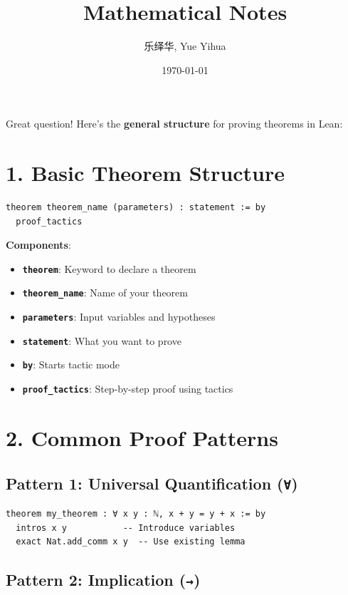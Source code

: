 \documentclass{amsart}
\author{乐绎华, Yue Yihua}
\date{\today}
\title{Mathematical Notes}
\theoremstyle{plain}
\theoremstyle{definition}
\theoremstyle{remark}
\begin{document}
\maketitle
\tableofcontents

Great question! Here's the \textbf{general structure} for proving theorems in Lean:


\section{\textbf{1. Basic Theorem Structure}}

\begin{lstlisting}[language=lean]
theorem theorem_name (parameters) : statement := by
  proof_tactics
\end{lstlisting}
\textbf{Components}:

\begin{itemize}
	\item \textbf{\lstinline{theorem}}: Keyword to declare a theorem
	\item \textbf{\lstinline{theorem_name}}: Name of your theorem
	\item \textbf{\lstinline{parameters}}: Input variables and hypotheses
	\item \textbf{\lstinline{statement}}: What you want to prove
	\item \textbf{\lstinline{by}}: Starts tactic mode
	\item \textbf{\lstinline{proof_tactics}}: Step-by-step proof using tactics
\end{itemize}


\section{\textbf{2. Common Proof Patterns}}

\subsection{\textbf{Pattern 1: Universal Quantification (\lstinline{∀})}}

\begin{lstlisting}[language=lean]
theorem my_theorem : ∀ x y : ℕ, x + y = y + x := by
  intros x y           -- Introduce variables
  exact Nat.add_comm x y  -- Use existing lemma
\end{lstlisting}
\subsection{\textbf{Pattern 2: Implication (\lstinline{→})}}
\end{document}

